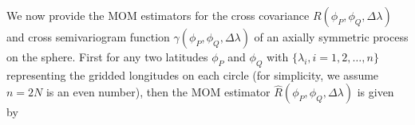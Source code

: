 We now provide the MOM estimators for the cross covariance $R(\phi_P, \phi_Q, \Delta \lambda)$ and cross semivariogram function $\gamma(\phi_P, \phi_Q, \Delta \lambda)$ of an axially symmetric process on the sphere. First for any two latitudes $\phi_P$ and $\phi_Q$ with $\{\lambda_i, i = 1, 2, \ldots, n\}$ representing the gridded longitudes on each circle (for simplicity, we assume $n = 2N$ is an even number), then the MOM estimator $\hat{R}(\phi_P, \phi_Q, \Delta \lambda)$ is given by
					
				
					
